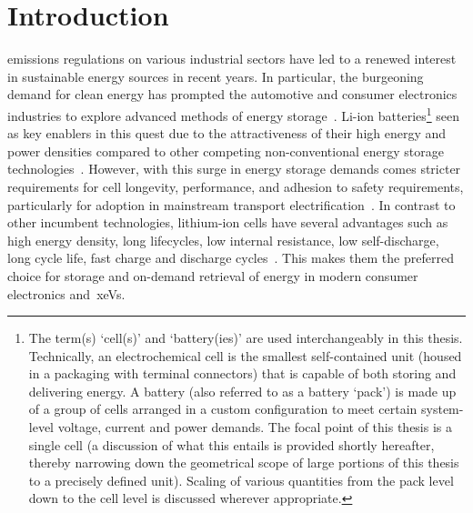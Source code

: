 
\clearpage
\chapter{Introduction}\label{ch:intro}


 emissions  regulations on various  industrial sectors
have led  to a renewed interest  in sustainable energy sources  in recent years.
In  particular,  the  burgeoning  demand  for  clean  energy  has  prompted  the
automotive and  consumer electronics industries  to explore advanced  methods of
energy storage~\cite{Weiss2011}. Li-ion batteries\footnote{The term(s) `cell(s)'
and  `battery(ies)'  are  used  interchangeably  in  this  thesis.  Technically,
an  electrochemical  cell is  the  smallest  self-contained  unit (housed  in  a
packaging  with  terminal  connectors)  that  is capable  of  both  storing  and
delivering energy. A battery  (also referred to as a battery  `pack') is made up
of  a  group  of cells  arranged  in  a  custom  configuration to  meet  certain
system-level  voltage,  current and  power  demands.  The  focal point  of  this
thesis  is  a  single cell  (a  discussion  of  what  this entails  is  provided
shortly  hereafter,  thereby  narrowing  down the  geometrical  scope  of  large
portions  of this  thesis  to  a precisely  defined  unit).  Scaling of  various
quantities from  the pack  level down  to the cell  level is  discussed wherever
appropriate.}  seen as  key enablers  in this  quest due  to the  attractiveness
of  their  high   energy  and  power  densities  compared   to  other  competing
non-conventional energy  storage technologies~\cite{Ibrahim2008}.  However, with
this  surge in  energy  storage  demands comes  stricter  requirements for  cell
longevity,  performance,  and  adhesion  to  safety  requirements,  particularly
for  adoption  in  mainstream  transport  electrification~\cite{Andrea2010}.  In
contrast  to  other  incumbent  technologies,  lithium-ion  cells  have  several
advantages  such  as   high  energy  density,  long   lifecycles,  low  internal
resistance,  low self-discharge,  long  cycle life,  fast  charge and  discharge
cycles~\cite{Reddy2011,Plett2015}.  This makes them the
preferred  choice  for storage  and  on-demand  retrieval  of energy  in  modern
consumer electronics and~\glspl{xeV}.


